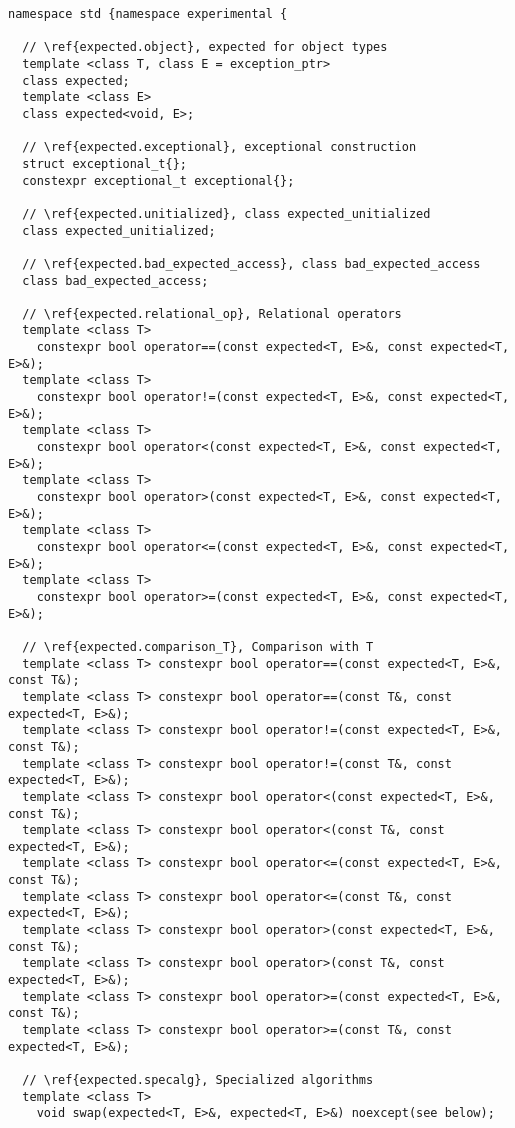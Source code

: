 \documentclass[a4paper,10pt]{article}
\begin{document}
\begin{lstlisting}
namespace std {namespace experimental {

  // \ref{expected.object}, expected for object types  
  template <class T, class E = exception_ptr>
  class expected;
  template <class E>
  class expected<void, E>;
  
  // \ref{expected.exceptional}, exceptional construction
  struct exceptional_t{};
  constexpr exceptional_t exceptional{};
  
  // \ref{expected.unitialized}, class expected_unitialized 
  class expected_unitialized;
  
  // \ref{expected.bad_expected_access}, class bad_expected_access
  class bad_expected_access;
  
  // \ref{expected.relational_op}, Relational operators
  template <class T>
    constexpr bool operator==(const expected<T, E>&, const expected<T, E>&);
  template <class T>
    constexpr bool operator!=(const expected<T, E>&, const expected<T, E>&);
  template <class T>
    constexpr bool operator<(const expected<T, E>&, const expected<T, E>&);
  template <class T>
    constexpr bool operator>(const expected<T, E>&, const expected<T, E>&);
  template <class T>
    constexpr bool operator<=(const expected<T, E>&, const expected<T, E>&);
  template <class T>
    constexpr bool operator>=(const expected<T, E>&, const expected<T, E>&);
    
  // \ref{expected.comparison_T}, Comparison with T
  template <class T> constexpr bool operator==(const expected<T, E>&, const T&);
  template <class T> constexpr bool operator==(const T&, const expected<T, E>&);
  template <class T> constexpr bool operator!=(const expected<T, E>&, const T&);
  template <class T> constexpr bool operator!=(const T&, const expected<T, E>&);
  template <class T> constexpr bool operator<(const expected<T, E>&, const T&);
  template <class T> constexpr bool operator<(const T&, const expected<T, E>&);
  template <class T> constexpr bool operator<=(const expected<T, E>&, const T&);
  template <class T> constexpr bool operator<=(const T&, const expected<T, E>&);
  template <class T> constexpr bool operator>(const expected<T, E>&, const T&);
  template <class T> constexpr bool operator>(const T&, const expected<T, E>&);
  template <class T> constexpr bool operator>=(const expected<T, E>&, const T&);
  template <class T> constexpr bool operator>=(const T&, const expected<T, E>&);

  // \ref{expected.specalg}, Specialized algorithms
  template <class T> 
    void swap(expected<T, E>&, expected<T, E>&) noexcept(see below);


\end{lstlisting}
\end{document}
